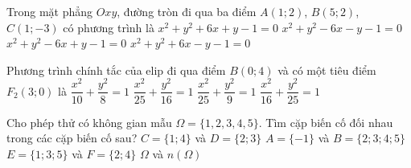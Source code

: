 \begin{ex}%
	Trong mặt phẳng $Oxy$, đường tròn đi qua ba điểm $A(1;2)$, $B(5;2)$, $C(1;-3)$ có phương trình là
	\choice
	{$x^2+y^2+6x+y-1=0$}
	{$x^2+y^2-6x-y-1=0$}
	{\True $x^2+y^2-6x+y-1=0$}
	{$x^2+y^2+6x-y-1=0$}
\end{ex}

\begin{ex}%
	Phương trình chính tắc của elip đi qua điểm $B(0;4)$ và có một tiêu điểm $F_2(3;0)$ là
	\choice
	{$\dfrac{x^2}{10}+\dfrac{y^2}{8}=1$}
	{\True $\dfrac{x^2}{25}+\dfrac{y^2}{16}=1$}
	{$\dfrac{x^2}{25}+\dfrac{y^2}{9}=1$}
	{$\dfrac{x^2}{16}+\dfrac{y^2}{25}=1$}
\end{ex}

\begin{ex}%
	Cho phép thử có không gian mẫu $\Omega = \{1,2,3,4,5\}$. Tìm cặp biến cố đối nhau trong các cặp biến cố sau?
	\choice
	{$C=\{1;4\}$ và $D=\{2;3\}$}
	{$A=\{-1\}$ và $B=\{2;3;4;5\}$}
	{\True $E=\{1;3;5\}$ và $F=\{2;4\}$}
	{$\Omega$ và $n(\Omega)$}
\end{ex}

